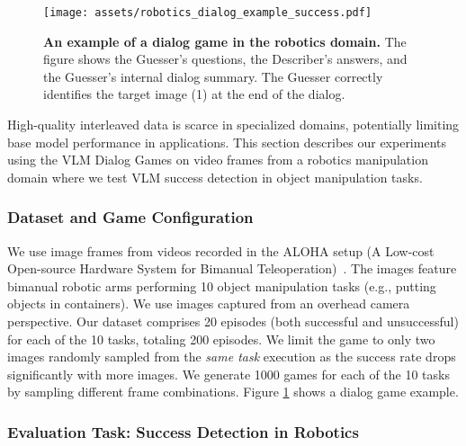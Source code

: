 \begin{figure}[t]
    \centering
    \texttt{[image: assets/robotics\_dialog\_example\_success.pdf]}
    \caption{
    \textbf{An example of a dialog game in the robotics domain.} The figure shows the Guesser's questions, the Describer's answers, and the Guesser's internal dialog summary.  The Guesser correctly identifies the target image (1) at the end of the dialog.}
    \vspace{-3mm}
    \label{fig:game-example-robotics-success}
\end{figure}

High-quality interleaved data is scarce in specialized domains, potentially limiting base model performance in applications.  
This section describes our experiments using the VLM Dialog Games on video frames from a robotics manipulation domain where we test VLM success detection in object manipulation tasks.

\subsubsection{Dataset and Game Configuration}
\label{sec:exps-robotics-setup}

We use image frames from videos recorded in the ALOHA setup (A Low-cost Open-source Hardware System for Bimanual Teleoperation)~\citep{zhao2023learning}.
The images feature bimanual robotic arms performing \num{10} object manipulation tasks (e.g., putting objects in containers).
We use images captured from an overhead camera perspective. 
Our dataset comprises \num{20} episodes (both successful and unsuccessful) for each of the \num{10} tasks, totaling \num{200} episodes. 
We limit the game to only two images randomly sampled from the \textit{same task} execution as the success rate drops significantly with more images.
We generate \num{1000} games for each of the \num{10} tasks by sampling different frame combinations.
Figure \ref{fig:game-example-robotics-success} shows a dialog game example.

\subsubsection{Evaluation Task: Success Detection in Robotics}

